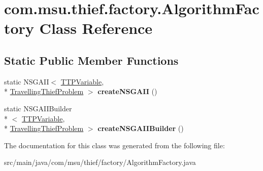 \hypertarget{classcom_1_1msu_1_1thief_1_1factory_1_1AlgorithmFactory}{\section{com.\-msu.\-thief.\-factory.\-Algorithm\-Factory Class Reference}
\label{classcom_1_1msu_1_1thief_1_1factory_1_1AlgorithmFactory}
}
\subsection*{Static Public Member Functions}
\begin{DoxyCompactItemize}
\item 
\hypertarget{classcom_1_1msu_1_1thief_1_1factory_1_1AlgorithmFactory_a4c4d6046c4a77971d55af366ba2e17aa}{static N\-S\-G\-A\-I\-I$<$ \hyperlink{classcom_1_1msu_1_1thief_1_1variable_1_1TTPVariable}{T\-T\-P\-Variable}, \\*
\hyperlink{classcom_1_1msu_1_1thief_1_1problems_1_1TravellingThiefProblem}{Travelling\-Thief\-Problem} $>$ {\bfseries create\-N\-S\-G\-A\-I\-I} ()}\label{classcom_1_1msu_1_1thief_1_1factory_1_1AlgorithmFactory_a4c4d6046c4a77971d55af366ba2e17aa}

\item 
\hypertarget{classcom_1_1msu_1_1thief_1_1factory_1_1AlgorithmFactory_a5f9f71ccff99caff8addaf104f26ad91}{static N\-S\-G\-A\-I\-I\-Builder\\*
$<$ \hyperlink{classcom_1_1msu_1_1thief_1_1variable_1_1TTPVariable}{T\-T\-P\-Variable}, \\*
\hyperlink{classcom_1_1msu_1_1thief_1_1problems_1_1TravellingThiefProblem}{Travelling\-Thief\-Problem} $>$ {\bfseries create\-N\-S\-G\-A\-I\-I\-Builder} ()}\label{classcom_1_1msu_1_1thief_1_1factory_1_1AlgorithmFactory_a5f9f71ccff99caff8addaf104f26ad91}

\end{DoxyCompactItemize}


The documentation for this class was generated from the following file\-:\begin{DoxyCompactItemize}
\item 
src/main/java/com/msu/thief/factory/Algorithm\-Factory.\-java\end{DoxyCompactItemize}
